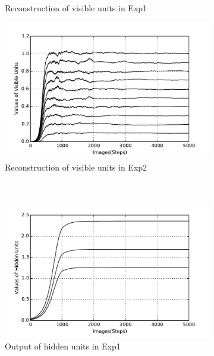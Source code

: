 \begin{figure}
\begin{subfigure}[t]{0.4\textwidth}
			\caption{Reconstruction of visible units in Exp1}
		\end{subfigure}
		\begin{subfigure}[t]{0.4\textwidth}
			\includegraphics[width=\textwidth]{pics_ae/exp2_recon_noisy_decay.pdf}
			\caption{Reconstruction of visible units in Exp2}
		\end{subfigure}\\
		\begin{subfigure}[t]{0.4\textwidth}
			\includegraphics[width=\textwidth]{pics_ae/exp1_hid_noisy_decay.pdf}
			\caption{Output of hidden units in Exp1}
		\end{subfigure}
		\begin{subfigure}[t]{0.4\textwidth}

\end{subfigure}
\end{figure}

